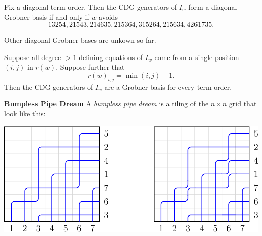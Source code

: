 \documentclass[co439]{subfiles}
\begin{document}
    \rruleline

    \clearpage

    \begin{theorem}{}
        Fix a diagonal term order. Then the CDG generators of $I_w$ form a diagonal Grobner basis if and only if $w$ avoids 
        \begin{equation*}
            13254,21543,214635,215364,315264,215634,4261735.
        \end{equation*}
    \end{theorem}

    \rruleline

    \np Other diagonal Grobner bases are unkown so far.
    
    \begin{theorem}{}
        Suppose all degree $>1$ defining equations of $I_w$ come from a single position $\left( i,j \right)$ in $r\left( w \right)$. Suppose further that
        \begin{equation*}
            r\left( w \right)_{i,j} = \min\left( i,j \right)-1.
        \end{equation*}
        Then the CDG generators of $I_w$ are a Grobner basis for every term order.
    \end{theorem}

    \rruleline
    
    \begin{definition}{\textbf{Bumpless Pipe Dream}}
        A \emph{bumpless pipe dream} is a tiling of the $n\times n$ grid that look like this:

        \begin{center}
            \includegraphics[scale=0.2]{bpd}
        \end{center}
    \end{definition}
\end{document}
